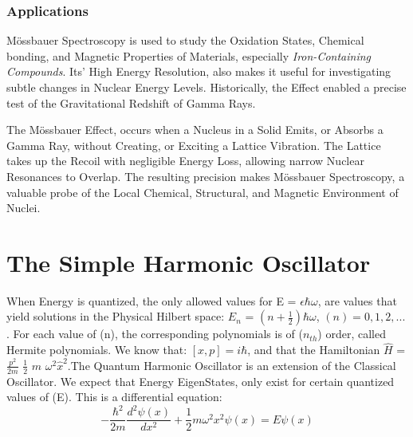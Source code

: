 \documentclass[a4paper, 10pt, onepage]{elegantbook}
\begin{document}
{\subsection{Applications}

M\"ossbauer Spectroscopy is used to study the Oxidation States, Chemical bonding, and Magnetic Properties of 
Materials, especially \emph{Iron-Containing Compounds}. Its' High Energy Resolution, also makes it useful for 
investigating subtle changes in Nuclear Energy Levels. Historically, the Effect enabled a precise test of the 
Gravitational Redshift of Gamma Rays.  

The M\"ossbauer Effect, occurs when a Nucleus in a Solid Emits, or Absorbs a Gamma Ray, without Creating, or 
Exciting a Lattice Vibration. The Lattice takes up the Recoil with negligible Energy Loss, allowing narrow Nuclear 
Resonances to Overlap. The resulting precision makes M\"ossbauer Spectroscopy, a valuable probe of the Local 
Chemical,
Structural, and Magnetic Environment of Nuclei.

\newpage

\chapter{The Simple Harmonic Oscillator}


When Energy is quantized, the only allowed values for E = $\epsilon \hbar \omega$, are values that yield solutions in 
the Physical Hilbert space: $E_n$ = $(n + \frac{1}{2}) \hbar \omega$, $(n) = 0, 1, 2,...$.  
For each value of (n), the corresponding polynomials is of ($n_{th}$) order, called Hermite polynomials. We know that: 
$\boxed{[x, p] = i \hbar}$, and that the Hamiltonian $\hat H$ = $\frac{p^2}{2m}$ $\frac{1}{2}$ $m$ $\omega^2 \hat 
x^2$.The Quantum Harmonic Oscillator is an extension of the Classical Oscillator. We expect that Energy EigenStates, 
only exist for certain quantized values of (E). This is a differential equation:
\begin{equation}
- \frac{\hbar^2}{2m}\frac{d^2 \psi (x)}{d x^2} + \frac{1}{2} m \omega^2 x^2 \psi (x) = E \psi (x)
\end{equation}

}
\end{document}
